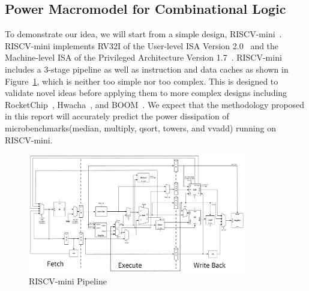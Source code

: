 \subsection{Power Macromodel for Combinational Logic}



To demonstrate our idea, we will start from a simple design, RISCV-mini~\cite{riscv-mini}.
RISCV-mini implements RV32I of the User-level ISA Version 2.0~\cite{riscv-user-2.0} and
the Machine-level ISA of the Privileged Architecture Version 1.7~\cite{riscv-prev-1.7}.
RISCV-mini includes a 3-stage pipeline as well as instruction and data caches as shown
in Figure~\ref{fig:riscv_mini}, which is neither too simple nor too complex. This is designed
to validate novel ideas before applying them to more complex designs including
RocketChip~\cite{RocketChip}, Hwacha~\cite{Hwacha}, and BOOM~\cite{BOOM}.
We expect that the methodology proposed in this report will accurately predict
the power dissipation of microbenchmarks(median, multiply, qsort, towers, and vvadd) running on RISCV-mini.

\begin{figure}
	\centering
	\includegraphics[width=0.85\textwidth,height=\textheight,keepaspectratio]{images/riscv_mini.pdf}
	\caption{RISCV-mini Pipeline}
	\label{fig:riscv_mini}
\end{figure}